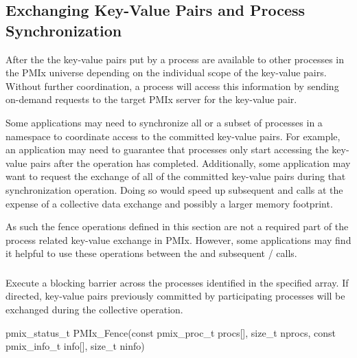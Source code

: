 \subsection{Exchanging Key-Value Pairs and Process Synchronization}
\label{chap:api_kv_mgmt:exchange}

After the  the key-value pairs put by a process are available to other processes in the \ac{PMIx} universe depending on the individual scope of the key-value pairs.
Without further coordination, a process will access this information by sending on-demand requests to the target \ac{PMIx} server for the key-value pair.

Some applications may need to synchronize all or a subset of processes in a namespace to coordinate access to the committed key-value pairs.
For example, an application may need to guarantee that processes only start accessing the key-value pairs after the  operation has completed.
Additionally, some application may want to request the exchange of all of the committed key-value pairs during that synchronization operation.
Doing so would speed up subsequent  and  calls at the expense of a collective data exchange and possibly a larger memory footprint.

As such the fence operations defined in this section are not a required part of the process related key-value exchange in \ac{PMIx}.
However, some applications may find it helpful to use these operations between the  and subsequent /  calls.


\subsubsection{}
\label{chap:api_kv_mgmt:fence}

\summary

Execute a blocking barrier across the processes identified in the specified array.
If directed, key-value pairs previously committed by participating processes will be exchanged during the collective operation.

\format

\cspecificstart
\begin{codepar}
pmix_status_t
PMIx_Fence(const pmix_proc_t procs[], size_t nprocs,
           const pmix_info_t info[], size_t ninfo)
\end{codepar}
\cspecificend

